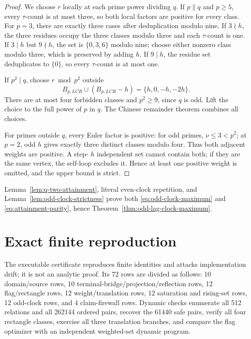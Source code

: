 \documentclass[11pt]{article}
\theoremstyle{definition}
\theoremstyle{remark}
\begin{document}
\begin{proof}
We choose \(r\) locally at each prime power dividing \(q\).  If
\(p\parallel q\) and \(p\geq5\), every \(\tau\)-count is at most three,
so both local factors are positive for every class.  For \(p=3\), there
are exactly three cases after deduplication modulo nine.  If \(3\nmid h\),
the three residues occupy the three classes modulo three and each
\(\tau\)-count is one.  If \(3\mid h\) but \(9\nmid h\), the set is
\(\{0,3,6\}\) modulo nine; choose either nonzero class modulo three, which
is preserved by adding \(h\).  If \(9\mid h\), the residue set deduplicates
to \(\{0\}\), so every \(\tau\)-count is at most one.

If \(p^2\mid q\), choose \(r\bmod p^2\) outside
\begin{equation}
 B_{p,LCR}\cup(B_{p,LCR}-h)=\{h,0,-h,-2h\}.
 \label{eq:four-class-avoidance}
\end{equation}
There are at most four forbidden classes and \(p^2\geq9\), since \(q\) is
odd.  Lift the choice to the full power of \(p\) in \(q\).  The Chinese
remainder theorem combines all choices.

For primes outside \(q\), every Euler factor is positive: for odd primes,
\(\nu\leq3<p^2\); at \(p=2\), odd \(h\) gives exactly three distinct
classes modulo four.  Thus both adjacent weights are positive.  A step-
\(h\) independent set cannot contain both; if they are the same vertex,
the self-loop excludes it.  Hence at least one positive weight is omitted,
and the upper bound is strict.
\end{proof}

Lemma~\ref{lem:q-two-attainment}, literal even-clock repetition, and
Lemma~\ref{lem:odd-clock-strictness} prove both
\eqref{eq:odd-clock-maximum} and \eqref{eq:attainment-parity}, hence
Theorem~\ref{thm:odd-lag-clock-maximum}.

\section{Exact finite reproduction}

The executable certificate reproduces finite identities and attacks
implementation drift; it is not an analytic proof.  Its 72 rows are divided
as follows: 10 domain/source rows, 10 terminal-bridge/projection/reflection
rows, 12 flag/rectangle rows, 12 weight/translation rows, 12 saturation and
rising-set rows, 12 odd-clock rows, and 4 claim-firewall rows.  Dynamic
checks enumerate all 512 relations and all 262144 ordered pairs, recover the
61440 safe pairs, verify all four rectangle classes, exercise all three
translation branches, and compare the flag optimizer with an independent
weighted-set dynamic program.
\end{document}
